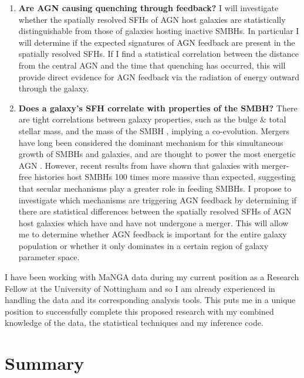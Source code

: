 \documentclass[11pt]{article}
\begin{document}
\begin{enumerate}[leftmargin=*]

\item {\bf Are AGN causing quenching through feedback?} I will investigate whether the spatially resolved SFHs of AGN host galaxies are statistically distinguishable from those of galaxies hosting inactive SMBHs. In particular I will determine if the expected signatures of AGN feedback are present in the spatially resolved SFHs. If I find a statistical correlation between the distance from the central AGN and the time that quenching has occurred, this will provide direct evidence for AGN feedback via the radiation of energy outward through the galaxy.

\item {\bf Does a galaxy's SFH correlate with properties of the SMBH?} There are tight correlations between galaxy properties, such as the bulge \& total stellar mass, and the mass of the SMBH \citep{haring04}, implying a co-evolution. Mergers have long been considered the dominant mechanism for this simultaneous growth of SMBHs and galaxies, and are thought to power the most energetic AGN \citep{hopkins08, treister12}. However, recent results from \citet[]{simmons17} have shown that galaxies with merger-free histories host SMBHs 100 times more massive than expected, suggesting that secular mechanisms play a greater role in feeding SMBHs. I propose to investigate which mechanisms are triggering AGN feedback by determining if there are statistical differences between the spatially resolved SFHs of AGN host galaxies which have and have not undergone a merger. This will allow me to determine whether AGN feedback is important for the entire galaxy population or whether it only dominates in a certain region of galaxy parameter space. 

\end{enumerate}

I have been working with MaNGA data during my current position as a Research Fellow at the University of Nottingham and so I am already experienced in handling the data and its corresponding analysis tools. This puts me in a unique position to successfully complete this proposed research with my combined knowledge of the data, the statistical techniques and my inference code.
\vspace{-0.5em}

\section*{\large Summary}
\vspace{-0.5em}
\end{document}
